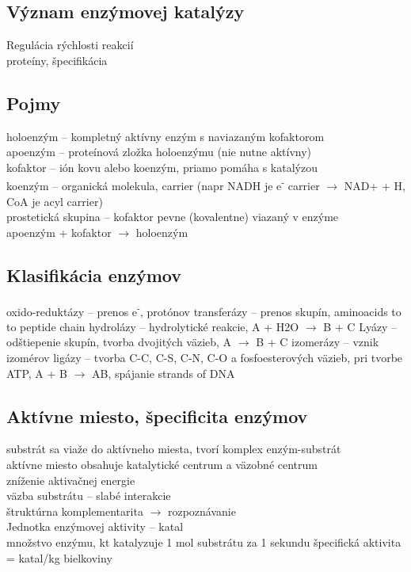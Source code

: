 \subsection*{Význam enzýmovej katalýzy}
Regulácia rýchlosti reakcií\\
proteíny, špecifikácia\\
\subsection*{Pojmy}
holoenzým -- kompletný aktívny enzým s naviazaným kofaktorom\\
apoenzým -- proteínová zložka holoenzýmu (nie nutne aktívny)\\
kofaktor -- ión kovu alebo koenzým, priamo pomáha s katalýzou\\
koenzým -- organická molekula, carrier (napr NADH je e\textsuperscript{-} carrier $\rightarrow$ NAD+ + H, CoA je acyl carrier)\\
prostetická skupina -- kofaktor pevne (kovalentne) viazaný v enzýme\\
apoenzým + kofaktor $\rightarrow$ holoenzým
\subsection*{Klasifikácia enzýmov}
oxido-reduktázy -- prenos e\textsuperscript{-}, protónov
transferázy -- prenos skupín, aminoacids to to peptide chain
hydrolázy -- hydrolytické reakcie, A + H2O $\rightarrow$ B + C
Lyázy -- odštiepenie skupín, tvorba dvojitých väzieb, A $\rightarrow$ B + C
izomerázy -- vznik izomérov
ligázy -- tvorba C-C, C-S, C-N, C-O a fosfoesterových väzieb, pri tvorbe ATP, A + B $\rightarrow$ AB, spájanie strands of DNA
\subsection*{Aktívne miesto, špecificita enzýmov}
substrát sa viaže do aktívneho miesta, tvorí komplex enzým-substrát\\
aktívne miesto obsahuje katalytické centrum a väzobné centrum\\
zníženie aktivačnej energie\\
väzba substrátu -- slabé interakcie\\
štruktúrna komplementarita $\rightarrow$ rozpoznávanie\\

Jednotka enzýmovej aktivity -- katal\\
\tab množstvo enzýmu, kt katalyzuje 1 mol substrátu za 1 sekundu
\tab špecifická aktivita = katal/kg bielkoviny
